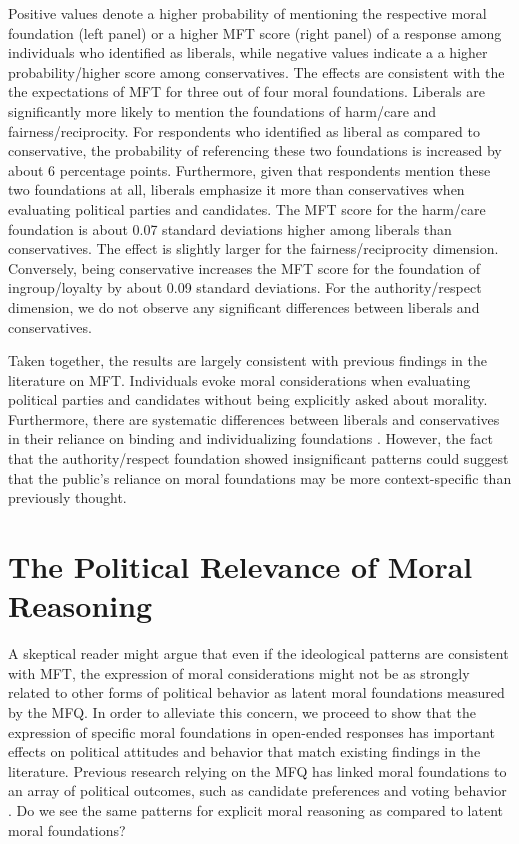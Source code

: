 \documentclass[12pt]{article}
\begin{document}
Positive values denote a higher probability of mentioning the respective moral foundation (left panel) or a higher MFT score (right panel) of a response among individuals who identified as liberals, while negative values indicate a a higher probability/higher score among conservatives. The effects are consistent with the the expectations of MFT for three out of four moral foundations. Liberals are significantly more likely to mention the foundations of harm/care and fairness/reciprocity. For respondents who identified as liberal as compared to conservative, the probability of referencing these two foundations is increased by about 6 percentage points. Furthermore, given that respondents mention these two foundations at all, liberals emphasize it more than conservatives when evaluating political parties and candidates. The MFT score for the harm/care foundation is about 0.07 standard deviations higher among liberals than conservatives. The effect is slightly larger for the fairness/reciprocity dimension. Conversely, being conservative increases the MFT score for the foundation of ingroup/loyalty by about 0.09 standard deviations. For the authority/respect dimension, we do not observe any significant differences between liberals and conservatives.

Taken together, the results are largely consistent with previous findings in the literature on MFT. Individuals evoke moral considerations when evaluating political parties and candidates without being explicitly asked about morality. Furthermore, there are systematic differences between liberals and conservatives in their reliance on binding and individualizing foundations \citep[see][for similar ideological differences when analyzing the content of life-narrative interviews]{mcadams2008family}. However, the fact that the authority/respect foundation showed insignificant patterns could suggest that the public's reliance on moral foundations may be more context-specific than previously thought.


\section*{The Political Relevance of Moral Reasoning}

A skeptical reader might argue that even if the ideological patterns are consistent with MFT, the expression of moral considerations might not be as strongly related to other forms of political behavior as latent moral foundations measured by the MFQ. In order to alleviate this concern, we proceed to show that the expression of specific moral foundations in open-ended responses has important effects on political attitudes and behavior that match existing findings in the literature. Previous research relying on the MFQ has linked moral foundations to an array of political outcomes, such as candidate preferences \citep{iyer2010beyond} and voting behavior \citep{franks2015using}. Do we see the same patterns for explicit moral reasoning as compared to latent moral foundations?
\end{document}
